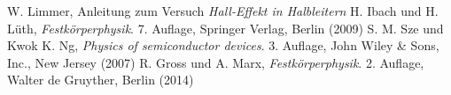 \documentclass[a4paper, parskip=half, 12pt]{scrartcl}
\begin{document}





\begin{thebibliography}{10}
 W. Limmer, Anleitung zum Versuch \emph{Hall-Effekt in Halbleitern}
 H. Ibach und H. Lüth, \emph{Festkörperphysik}. 7. Auflage, Springer Verlag, Berlin (2009)
 S. M. Sze und Kwok K. Ng, \emph{Physics of semiconductor devices}. 3. Auflage, John Wiley \& Sons, Inc., New Jersey (2007)
 R. Gross und A. Marx, \emph{Festkörperphysik}. 2. Auflage, Walter de Gruyther, Berlin (2014)
\end{thebibliography}
\end{document}
